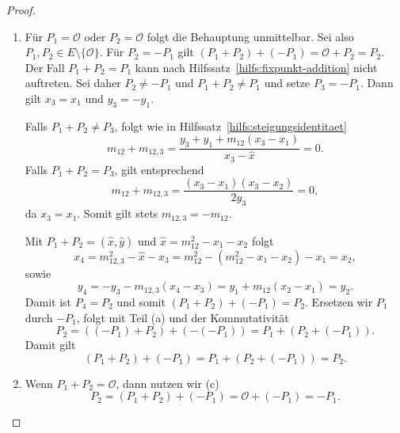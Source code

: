 \begin{proof}
\begin{enumerate}[label=(\alph*)]
              \begin{align*}
                  (-P_1)+(-P_2)= & (-x_1-x_2+m(P_1,P_2)^2,y_1-m(P_1,P_2)(x_3-x_1))
                  =              & -(P_1+P_2).
              \end{align*}
        \item Für $P_1=\mathcal{O}$ oder $P_2=\mathcal{O}$ folgt die Behauptung unmittelbar. Sei also $P_1,P_2\in E\setminus\{\mathcal{O}\}$. Für $P_2=-P_1$ gilt $(P_1+P_2)+(-P_1)=\mathcal{O}+P_2=P_2$. Der Fall $P_1+P_2=P_1$ kann nach Hilfssatz~\ref{hilfs:fixpunkt-addition} nicht auftreten. Sei daher $P_2\neq -P_1$ und $P_1+P_2\neq P_1$ und setze $P_3=-P_1$. Dann gilt $x_3=x_1$ und $y_3=-y_1$.

              Falls $P_1+P_2\neq P_3$, folgt wie in Hilfssatz~\ref{hilfs:steigungsidentitaet}
              \[
                  m_{12}+m_{12,3}
                  =
                  \frac{y_3+y_1+m_{12}(x_3-x_1)}{x_3-\hat{x}}
                  =0.
              \]
              Falls $P_1+P_2=P_3$, gilt entsprechend
              \[
                  m_{12}+m_{12,3}
                  =
                  \frac{(x_3-x_1)(x_3-x_2)}{2y_3}
                  =0,
              \]
              da $x_3=x_1$. Somit gilt stets $m_{12,3}=-m_{12}$.

              Mit $P_1+P_2=(\hat{x},\hat{y})$ und $\hat{x}=m_{12}^2-x_1-x_2$ folgt
              \[
                  x_4=m_{12,3}^2-\hat{x}-x_3
                  =m_{12}^2-(m_{12}^2-x_1-x_2)-x_1=x_2,
              \]
              sowie
              \[
                  y_4=-y_3-m_{12,3}(x_4-x_3)
                  =y_1+m_{12}(x_2-x_1)=y_2.
              \]
              Damit ist $P_4=P_2$ und somit $(P_1+P_2)+(-P_1)=P_2$. Ersetzen wir $P_1$ durch $-P_1$, folgt mit Teil (a) und der Kommutativität
              \[
                  P_2=((-P_1)+P_2)+(-(-P_1))
                  =P_1+(P_2+(-P_1)).
              \]
              Damit gilt
              \[
                  (P_1+P_2)+(-P_1)=P_1+(P_2+(-P_1))=P_2.
              \]
        \item Wenn $P_1+P_2=\mathcal{O}$, dann nutzen wir (c)
              \[
                  P_2=(P_1+P_2)+(-P_1)=\mathcal{O}+(-P_1)=-P_1.
              \]
    \end{enumerate}
\end{proof}

